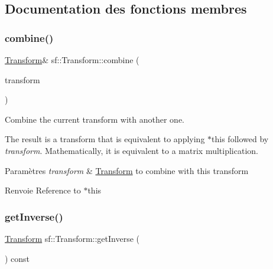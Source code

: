 \subsection{Documentation des fonctions membres}
\mbox{\label{classsf_1_1Transform_acd978f60421a0f839bb9a8263e8877ff}} 
\subsubsection{\texorpdfstring{combine()}{combine()}}
{\footnotesize\ttfamily \hyperlink{classsf_1_1Transform}{Transform}\& sf\+::\+Transform\+::combine (\begin{DoxyParamCaption}\item[{const \hyperlink{classsf_1_1Transform}{Transform} \&}]{transform }\end{DoxyParamCaption})}



Combine the current transform with another one. 

The result is a transform that is equivalent to applying $\ast$this followed by {\itshape transform}. Mathematically, it is equivalent to a matrix multiplication.


\begin{DoxyParams}{Paramètres}
{\em transform} & \hyperlink{classsf_1_1Transform}{Transform} to combine with this transform\\
\hline
\end{DoxyParams}
\begin{DoxyReturn}{Renvoie}
Reference to $\ast$this 
\end{DoxyReturn}
\mbox{\label{classsf_1_1Transform_a14f49e81af44aabcff7611f6703a1e4a}} 
\subsubsection{\texorpdfstring{get\+Inverse()}{getInverse()}}
{\footnotesize\ttfamily \hyperlink{classsf_1_1Transform}{Transform} sf\+::\+Transform\+::get\+Inverse (\begin{DoxyParamCaption}{ }\end{DoxyParamCaption}) const}



